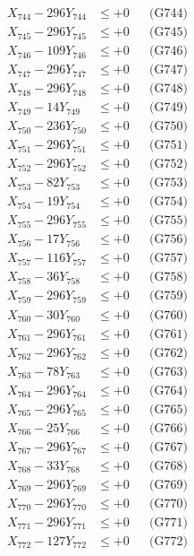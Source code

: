 \documentclass[a4paper,10pt]{article}
\begin{document}
{\begin{align}
X_{744} - 296Y_{744} &\leq +0 && \text{(G744)} \\
X_{745} - 296Y_{745} &\leq +0 && \text{(G745)} \\
X_{746} - 109Y_{746} &\leq +0 && \text{(G746)} \\
X_{747} - 296Y_{747} &\leq +0 && \text{(G747)} \\
X_{748} - 296Y_{748} &\leq +0 && \text{(G748)} \\
X_{749} - 14Y_{749} &\leq +0 && \text{(G749)} \\
X_{750} - 236Y_{750} &\leq +0 && \text{(G750)} \\
\allowbreak
X_{751} - 296Y_{751} &\leq +0 && \text{(G751)} \\
X_{752} - 296Y_{752} &\leq +0 && \text{(G752)} \\
X_{753} - 82Y_{753} &\leq +0 && \text{(G753)} \\
X_{754} - 19Y_{754} &\leq +0 && \text{(G754)} \\
X_{755} - 296Y_{755} &\leq +0 && \text{(G755)} \\
X_{756} - 17Y_{756} &\leq +0 && \text{(G756)} \\
X_{757} - 116Y_{757} &\leq +0 && \text{(G757)} \\
X_{758} - 36Y_{758} &\leq +0 && \text{(G758)} \\
X_{759} - 296Y_{759} &\leq +0 && \text{(G759)} \\
X_{760} - 30Y_{760} &\leq +0 && \text{(G760)} \\
\allowbreak
X_{761} - 296Y_{761} &\leq +0 && \text{(G761)} \\
X_{762} - 296Y_{762} &\leq +0 && \text{(G762)} \\
X_{763} - 78Y_{763} &\leq +0 && \text{(G763)} \\
X_{764} - 296Y_{764} &\leq +0 && \text{(G764)} \\
X_{765} - 296Y_{765} &\leq +0 && \text{(G765)} \\
X_{766} - 25Y_{766} &\leq +0 && \text{(G766)} \\
X_{767} - 296Y_{767} &\leq +0 && \text{(G767)} \\
X_{768} - 33Y_{768} &\leq +0 && \text{(G768)} \\
X_{769} - 296Y_{769} &\leq +0 && \text{(G769)} \\
X_{770} - 296Y_{770} &\leq +0 && \text{(G770)} \\
\allowbreak
X_{771} - 296Y_{771} &\leq +0 && \text{(G771)} \\
X_{772} - 127Y_{772} &\leq +0 && \text{(G772)} \\

\end{align}}
\end{document}
